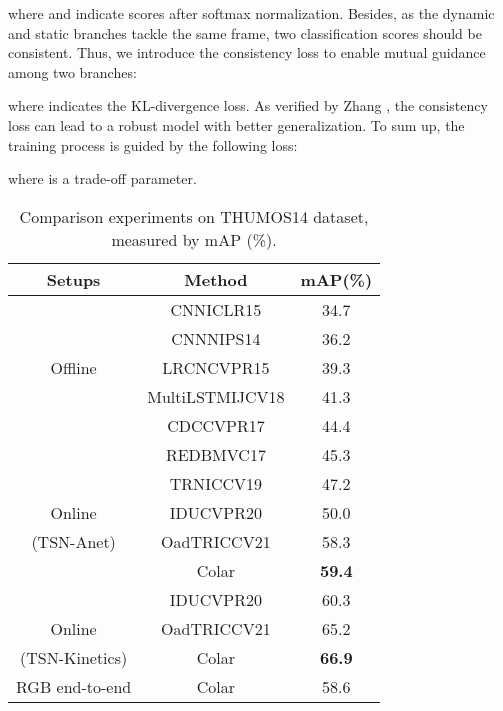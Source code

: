 \documentclass[10pt,twocolumn,letterpaper]{article}
\begin{document}
where  and  indicate scores after softmax normalization. Besides, as the dynamic and static branches tackle the same frame, two classification scores should be consistent. Thus, we introduce the consistency loss  to enable mutual guidance among two branches:

where  indicates the KL-divergence loss. As verified by Zhang \etal \cite{zhang2018deep}, the consistency loss can lead to a robust model with better generalization. To sum up, the training process is guided by the following loss:

where  is a trade-off parameter.


\begin{table}[thbp]
  \centering
  \caption{Comparison experiments on THUMOS14 dataset, measured by mAP (\%).}
    \begin{tabular}{cc|c}
    \toprule
    \toprule
    Setups & Method & mAP(\%) \\
    \midrule
    \midrule
          & CNN\cite{simonyan2014very}{\scriptsize ICLR15} & 34.7 \\
          & CNN\cite{simonyan2014two}{\scriptsize NIPS14} & 36.2 \\
    Offline & LRCN\cite{donahue2015long}{\scriptsize CVPR15} & 39.3 \\
          & MultiLSTM\cite{yeung2018every}{\scriptsize IJCV18} & 41.3 \\
          & CDC\cite{shou2017cdc}{\scriptsize CVPR17} & 44.4 \\
    \midrule
          & RED\cite{gao2017red}{\scriptsize BMVC17} & 45.3 \\
          & TRN\cite{xu2019temporal}{\scriptsize ICCV19} & 47.2 \\
    Online & IDU\cite{eun2020learning}{\scriptsize CVPR20} & 50.0 \\
    (TSN-Anet) & OadTR\cite{wang2021oadtr}{\scriptsize ICCV21} & 58.3 \\
          & Colar & \textbf{59.4} \\
    \midrule
          & IDU\cite{eun2020learning}{\scriptsize CVPR20} & 60.3 \\
    Online & OadTR\cite{wang2021oadtr}{\scriptsize ICCV21} & 65.2 \\
    (TSN-Kinetics) & Colar & \textbf{66.9} \\
    \midrule
    RGB end-to-end & Colar & 58.6 \\
    \bottomrule
    \end{tabular}\label{tabCmpTHUMOS}\end{table}
\end{document}
